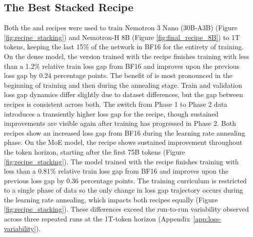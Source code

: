 \subsection{The Best Stacked Recipe}
Both the \newrecipe and \nvrecipe recipes were used to train Nemotron 3 Nano (30B-A3B) (Figure \ref{fig:recipe_stacking}) and Nemotron-H 8B (Figure \ref{fig:final_recipe_8B}) to 1T tokens, keeping the last 15\% of the network in BF16 for the entirety of training. On the dense model, the version trained with the \newrecipe{} recipe finishes training with less than a 1.2\% relative train loss gap from BF16 and improves upon the previous loss gap by 0.24 percentage points. The benefit of \newrecipe is most pronounced in the beginning of training and then during the annealing stage. Train and validation loss gap dynamics differ slightly due to dataset differences, but the gap between recipes is consistent across both. The switch from Phase 1 to Phase 2 data introduces a transiently higher loss gap for the \newrecipe{} recipe, though sustained improvements are  visible again after training has progressed in Phase 2. Both recipes show an increased loss gap from BF16 during the learning rate annealing phase. On the MoE model, the \newrecipe{} recipe shows sustained improvement throughout the token horizon, starting after the first 75B tokens (Figure \ref{fig:recipe_stacking}). The model trained with the \newrecipe recipe finishes training with less than a 0.81\% relative train loss gap from BF16 and improves upon the previous loss gap by 0.36 percentage points. The training curriculum is restricted to a single phase of data so the only change in loss gap trajectory occurs during the learning rate annealing, which impacts both recipes equally (Figure \ref{fig:recipe_stacking}). These differences exceed the run-to-run variability observed across three repeated runs at the 1T-token horizon (Appendix~\ref{app:loss-variability}). 


